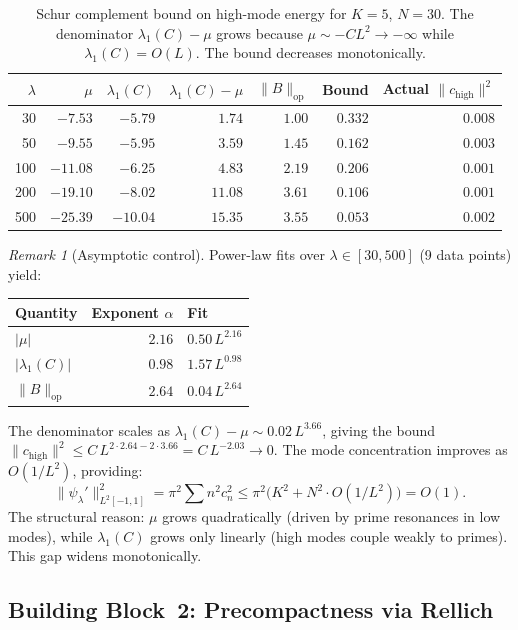 \documentclass[12pt,a4paper]{article}
\theoremstyle{definition}
\theoremstyle{remark}
\newtheorem{remark}[theorem]{Remark}
\begin{document}
\begin{table}[h]
\centering
\small
\renewcommand{\arraystretch}{1.15}
\begin{tabular}{r|r|r|r|r|r|r}
$\lambda$ & $\mu$ & $\lambda_1(C)$ & $\lambda_1(C) - \mu$ & $\|B\|_{\mathrm{op}}$ & Bound & Actual $\|c_{\mathrm{high}}\|^2$ \\\hline
30  & $-7.53$  & $-5.79$ & $1.74$  & $1.00$ & $0.332$ & $0.008$ \\
50  & $-9.55$  & $-5.95$ & $3.59$  & $1.45$ & $0.162$ & $0.003$ \\
100 & $-11.08$ & $-6.25$ & $4.83$  & $2.19$ & $0.206$ & $0.001$ \\
200 & $-19.10$ & $-8.02$ & $11.08$ & $3.61$ & $0.106$ & $0.001$ \\
500 & $-25.39$ & $-10.04$ & $15.35$ & $3.55$ & $0.053$ & $0.002$
\end{tabular}
\caption{Schur complement bound on high-mode energy for $K = 5$, $N = 30$. The denominator $\lambda_1(C) - \mu$ grows because $\mu \sim -CL^2 \to -\infty$ while $\lambda_1(C) = O(L)$. The bound decreases monotonically.}
\label{tab:schur}
\end{table}

\begin{remark}[Asymptotic control]
Power-law fits over $\lambda \in [30, 500]$ (9 data points) yield:
\begin{center}
\begin{tabular}{l|r|l}
Quantity & Exponent $\alpha$ & Fit \\\hline
$|\mu|$ & $2.16$ & $0.50\,L^{2.16}$ \\
$|\lambda_1(C)|$ & $0.98$ & $1.57\,L^{0.98}$ \\
$\|B\|_{\mathrm{op}}$ & $2.64$ & $0.04\,L^{2.64}$
\end{tabular}
\end{center}
The denominator scales as $\lambda_1(C) - \mu \sim 0.02\,L^{3.66}$, giving the bound $\|c_{\mathrm{high}}\|^2 \leq C\,L^{2 \cdot 2.64 - 2 \cdot 3.66} = C\,L^{-2.03} \to 0$. The mode concentration improves as $O(1/L^2)$, providing:
\[
  \|\psi_\lambda'\|_{L^2[-1,1]}^2 = \pi^2 \sum n^2 c_n^2 \leq \pi^2\bigl(K^2 + N^2 \cdot O(1/L^2)\bigr) = O(1).
\]
The structural reason: $\mu$ grows quadratically (driven by prime resonances in low modes), while $\lambda_1(C)$ grows only linearly (high modes couple weakly to primes). This gap widens monotonically.
\end{remark}

\subsection{Building Block~2: Precompactness via Rellich}
\end{document}
